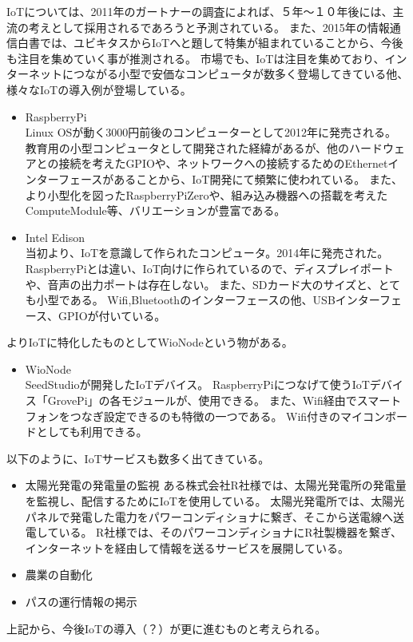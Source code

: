 IoTについては、2011年のガートナーの調査によれば、５年〜１０年後には、主流の考えとして採用されるであろうと予測されている。
また、2015年の情報通信白書では、ユビキタスからIoTへと題して特集が組まれていることから、今後も注目を集めていく事が推測される。
市場でも、IoTは注目を集めており、インターネットにつながる小型で安価なコンピュータが数多く登場してきている他、様々なIoTの導入例が登場している。
\begin{itemize}
\item RaspberryPi\\
	Linux OSが動く3000円前後のコンピューターとして2012年に発売される。
	教育用の小型コンピュータとして開発された経緯があるが、他のハードウェアとの接続を考えたGPIOや、ネットワークへの接続するためのEthernetインターフェースがあることから、IoT開発にて頻繁に使われている。
	また、より小型化を図ったRaspberryPiZeroや、組み込み機器への搭載を考えたComputeModule等、バリエーションが豊富である。
\item Intel Edison\\
	当初より、IoTを意識して作られたコンピュータ。2014年に発売された。
	RaspberryPiとは違い、IoT向けに作られているので、ディスプレイポートや、音声の出力ポートは存在しない。
	また、SDカード大のサイズと、とても小型である。
	Wifi,Bluetoothのインターフェースの他、USBインターフェース、GPIOが付いている。
\end{itemize}
よりIoTに特化したものとしてWioNodeという物がある。
\begin{itemize}
\item WioNode\\
	SeedStudioが開発したIoTデバイス。
	RaspberryPiにつなげて使うIoTデバイス「GrovePi」の各モジュールが、使用できる。
	また、Wifi経由でスマートフォンをつなぎ設定できるのも特徴の一つである。
	Wifi付きのマイコンボードとしても利用できる。
\end{itemize}

以下のように、IoTサービスも数多く出てきている。
\begin{itemize}
\item 太陽光発電の発電量の監視
	ある株式会社R社様では、太陽光発電所の発電量を監視し、配信するためにIoTを使用している。
	太陽光発電所では、太陽光パネルで発電した電力をパワーコンディショナに繋ぎ、そこから送電線へ送電している。
	R社様では、そのパワーコンディショナにR社製機器を繋ぎ、インターネットを経由して情報を送るサービスを展開している。
\item 農業の自動化
	
\item パスの運行情報の掲示
	
\end{itemize}
上記から、今後IoTの導入（？）が更に進むものと考えられる。

